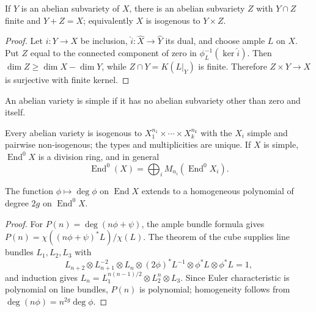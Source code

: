 \begin{theorem}
\label{mumford-thm-poincare-complete-reducibility}
If $Y$ is an abelian subvariety of $X$, there is an abelian subvariety $Z$
with $Y\cap Z$ finite and $Y+Z=X$; equivalently $X$ is isogenous to
$Y\times Z$.
\end{theorem}
\begin{proof}
Let $i:Y\to X$ be inclusion, $\widehat i:\widehat X\to\widehat Y$ its
dual, and choose ample $L$ on $X$. Put $Z$ equal to the connected component
of zero in $\phi_L^{-1}(\ker\widehat i)$. Then
$\dim Z\ge\dim X-\dim Y$, while
$Z\cap Y=K(L|_Y)$ is finite. Therefore $Z\times Y\to X$ is surjective
with finite kernel.
\end{proof}

\begin{definition}
\label{mumford-def-simple-abelian-variety}
An abelian variety is simple if it has no abelian subvariety other than zero
and itself.
\end{definition}

\begin{corollary}
\label{mumford-cor-simple-decomposition}
\label{mumford-cor-simple-endomorphism-algebra}
Every abelian variety is isogenous to
$X_1^{n_1}\times\cdots\times X_k^{n_k}$ with the $X_i$ simple and pairwise
non-isogenous; the types and multiplicities are unique. If $X$ is simple,
$\operatorname{End}^0X$ is a division ring, and in general
\[
\operatorname{End}^0(X)=\bigoplus_iM_{n_i}(\operatorname{End}^0X_i).
\]
\notready
\end{corollary}

\begin{theorem}
\label{mumford-thm-degree-polynomial}
The function $\phi\mapsto\deg\phi$ on $\operatorname{End}X$ extends to a
homogeneous polynomial of degree $2g$ on $\operatorname{End}^0X$.
\end{theorem}
\begin{proof}
For $P(n)=\deg(n\phi+\psi)$, the ample bundle formula gives
$P(n)=\chi((n\phi+\psi)^*L)/\chi(L)$. The theorem of the cube supplies
line bundles $L_1,L_2,L_3$ with
\[
L_{n+2}\otimes L_{n+1}^{-2}\otimes L_n\otimes(2\phi)^*L^{-1}
\otimes\phi^*L\otimes\phi^*L=1,
\]
and induction gives
$L_n=L_1^{n(n-1)/2}\otimes L_2^n\otimes L_3$. Since Euler characteristic
is polynomial on line bundles, $P(n)$ is polynomial; homogeneity follows
from $\deg(n\phi)=n^{2g}\deg\phi$.
\end{proof}

